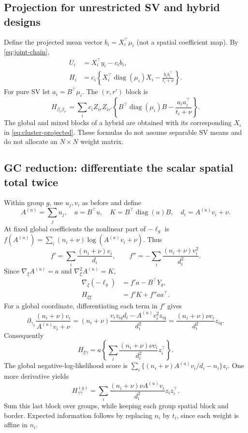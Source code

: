 \documentclass[11pt,a4paper]{article}
\newcommand{\diag}{\operatorname{diag}}
\numberwithin{equation}{section}
\begin{document}
\subsection{Projection for unrestricted SV and hybrid designs}
Define the projected mean vector
$b_i=X_i^\top\mu_i$ (not a spatial coefficient map).
By \eqref{eq:joint-chain},
\begin{align}
 U_i&=X_i^\top y_i-c_i b_i,\\
 H_i&=c_i\left\{X_i^\top\diag(\mu_i)X_i
                        -\frac{b_ib_i^\top}{t_i+\nu}\right\}.
 \label{eq:cluster-projected}
\end{align}
For pure SV let $a_i=B^\top\mu_i$. The $(r,r')$ block is
\begin{equation}
 H_{\beta_r\beta_{r'}}
 =\sum_i c_iZ_{ir}Z_{ir'}
       \left\{B^\top\diag(\mu_i)B-\frac{a_ia_i^\top}{t_i+\nu}\right\}.
\end{equation}
The global and mixed blocks of a hybrid are obtained with its
corresponding $X_i$ in \eqref{eq:cluster-projected}.
These formulas do not assume separable SV means and do not allocate
an $N\times N$ weight matrix.

\subsection{GC reduction: differentiate the scalar spatial total twice}
Within group $g$, use $u_j,v_i$ as before and define
\[
 A^{(u)}=\sum_j u_j,\quad a=B^\top u,\quad
 K=B^\top\diag(u)B,\quad d_i=A^{(u)}v_i+\nu .
\]
At fixed global coefficients the nonlinear part of $-\ell_g$ is
$f(A^{(u)})=\sum_i(n_i+\nu)\log(A^{(u)}v_i+\nu)$.
Thus
\[
 f'=\sum_i\frac{(n_i+\nu)v_i}{d_i},\qquad
 f''=-\sum_i\frac{(n_i+\nu)v_i^2}{d_i^2}.
\]
Since $\nabla_\xi A^{(u)}=a$ and $\nabla_\xi^2A^{(u)}=K$,
\begin{align}
 \nabla_\xi(-\ell_g)&=f'a-B^\top Y_g,\\
 H_{\xi\xi}&=f'K+f''aa^\top.
 \label{eq:cluster-gc-spatial}
\end{align}
For a global coordinate, differentiating each term in $f'$ gives
\[
 \partial_{\gamma_q}\frac{(n_i+\nu)v_i}{A^{(u)}v_i+\nu}
 =(n_i+\nu)\frac{v_i z_{iq}d_i-A^{(u)}v_i^2z_{iq}}{d_i^2}
 =\frac{(n_i+\nu)\nu v_i}{d_i^2}z_{iq}.
\]
Consequently
\begin{equation}
 H_{\xi\gamma}
 =a\left\{\sum_i\frac{(n_i+\nu)\nu v_i}{d_i^2}z_i^\top\right\}.
\end{equation}
The global negative-log-likelihood score is
$\sum_i\{(n_i+\nu)A^{(u)}v_i/d_i-n_i\}z_i$.
One more derivative yields
\begin{equation}
 H_{\gamma\gamma}^{(g)}
 =\sum_i\frac{(n_i+\nu)\nu A^{(u)}v_i}{d_i^2}z_iz_i^\top.
\end{equation}
Sum this last block over groups, while keeping each group spatial block
and border. Expected information follows by replacing $n_i$ by $t_i$,
since each weight is affine in $n_i$.
\end{document}
